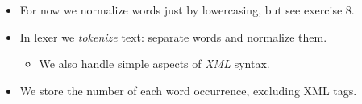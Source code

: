 \documentclass{beamer}
\newcommand{\tmem}[1]{{\em #1\/}}
\begin{document}
\begin{itemize}
{{  {\hlstd{ \ }}{}{}{\hlopt{=
  }}{}{\hlstd{ }}{}{\hlopt{[}}{}{}{\hlopt{]}}{\hlendline{}}\\
  {\hlstd{ \ }}{}{}{\hlopt{=
  }}{}{}{\hlopt{=
  }}{}{\hlstd{{\hlendline{}}\\
  \ }}{}{\hlendline{}}\\
  {\hlstd{ \ \ \ }}{}{}{\hlopt{.[}}{}{\hlopt{] =
  }}{}{\hlopt{\&\& }}{}{\hlopt{.[}}{}{\hlopt{]
  = }}{}{}{\hlopt{[}}{}{}{}{\hlopt{]}}{\hlendline{}}\\
  {\hlstd{ \ \ \ }}{}{\hlopt{[}}{}{\hlopt{;
  }}{}{\hlopt{]}}{\hlendline{}}\\
  {\hlstd{ \ }}{}{}{\hlopt{=
  }}{}{\hlstd{ }}{}{\hlopt{[}}{}{\hlopt{;
  }}{}{\hlopt{]}}{\hlendline{}}\\
  {\hlstd{ \ }}{}{\hlopt{[}}{}{}{}{\hlopt{]}}{\hlendline{}}}}
  
  \item For now we normalize words just by lowercasing, but see exercise 8.
  
  \item In lexer we {\tmem{tokenize}} text: separate words and normalize them.
  \begin{itemize}
    \item We also handle simple aspects of {\tmem{XML}} syntax.
  \end{itemize}
  \item We store the number of each word occurrence, excluding XML tags.
\end{itemize}
\end{document}
